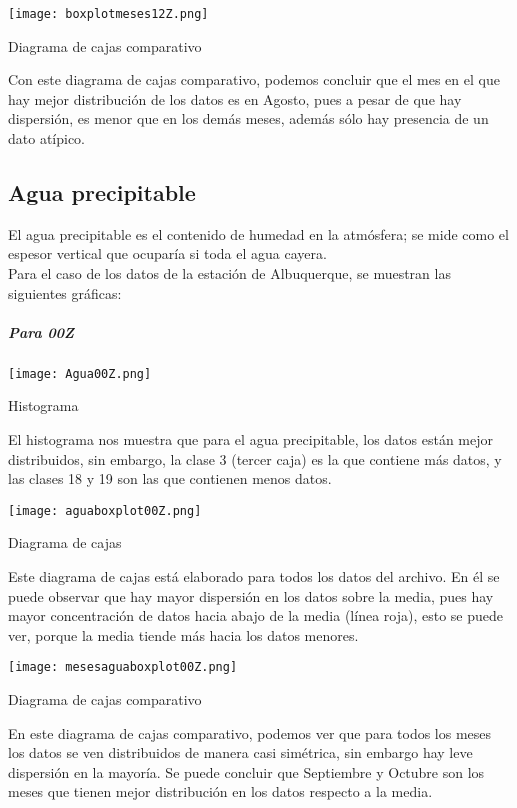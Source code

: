 \documentclass[12pt]{article}
\begin{document}
\begin{doublespace}
\begin{center}
\texttt{[image: boxplotmeses12Z.png]}

Diagrama de cajas comparativo
\end{center}
Con este diagrama de cajas comparativo, podemos concluir que el mes en el que hay mejor distribución de los datos es en Agosto, pues a pesar de que hay dispersión, es menor que en los demás meses, además sólo hay presencia de un dato atípico.
\subsection{Agua precipitable}
El agua precipitable es el contenido de humedad en la atmósfera; se mide como el espesor vertical que ocuparía si toda el agua cayera.
\\

Para el caso de los datos de la estación de Albuquerque, se muestran las siguientes gráficas:

\pagebreak
\subparagraph*{Para 00Z}
\begin{center}
\texttt{[image: Agua00Z.png]}

Histograma
\end{center}

El histograma nos muestra que para el agua precipitable, los datos están mejor distribuidos, sin embargo, la clase 3 (tercer caja) es la que contiene más datos, y las clases 18 y 19 son las que contienen menos datos.

\begin{center}
\vspace{1 cm}

\texttt{[image: aguaboxplot00Z.png]}

Diagrama de cajas
\end{center}
Este diagrama de cajas está elaborado para todos los datos del archivo. En él se puede observar que hay mayor dispersión en los datos sobre la media, pues hay mayor concentración de datos hacia abajo de la media (línea roja), esto se puede ver, porque la media tiende más hacia los datos menores.
\begin{center}
\vspace{1 cm}

\texttt{[image: mesesaguaboxplot00Z.png]}

Diagrama de cajas comparativo
\end{center}
En este diagrama de cajas comparativo, podemos ver que para todos los meses los datos se ven distribuidos de manera casi simétrica, sin embargo hay leve dispersión en la mayoría. Se puede concluir que Septiembre y Octubre son los meses que tienen mejor distribución en los datos respecto a la media.


\end{doublespace}
\end{document}
